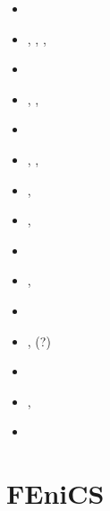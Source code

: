 \begin{small}
\begin{itemize}
\item[\twothousandone]       \textcite{modm01}
\item[\twothousandthree]     \textcite{modm03},  \textcite{wibm03}
                             \textcite{mumc03},  \textcite{wemv03}
                             \textcite{onmo03},  \textcite{onml03}
\item[\twothousandfour]      \textcite{wijns2004}
\item[\twothousandfive]      \textcite{wiwg05},  \textcite{onml05},  \textcite{onmj05}
\item[\twothousandsix]       \textcite{onmm06} 
\item[\twothousandseven]     \textcite{moql07},  \textcite{gewm07}
                             \textcite{dyrm07},  \textcite{onlm07}
\item[\twothousandeight]     \textcite{onlg08},  \textcite{clsm08}
\item[\twothousandnine]      \textcite{onlj09},  \textcite{retw09}
\item[\twothousandten]       \textcite{pyeg10}
\item[\twothousandeleven]    \textcite{legu11},  \textcite{retk11}
\item[\twothousandtwelve]    \textcite{lega12}
\item[\twothousandfourteen]  \textcite{recf14}, \textcite{capi14}(?)
\item[\twothousandtwentyone] \textcite{zhle21}
\item[\twothousandtwentythree] \textcite{zhll23}, \textcite{zhlc23}
\item[\twothousandtwentyfour] \textcite{recf24}
\end{itemize}
\end{small}


\section{FEniCS}

